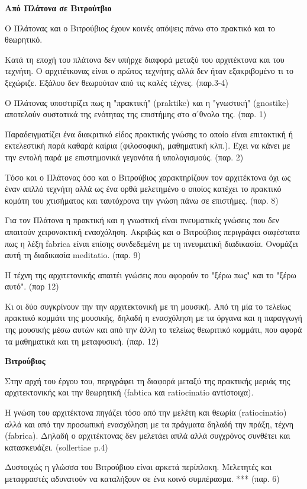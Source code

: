 \textbf{Από Πλάτονα σε Βιτρούτβιο}

Ο Πλάτονας και ο Βιτρούβιος έχουν κοινές απόψεις πάνω στο πρακτικό και το
θεωρητικό.

Κατά τη εποχή του πλάτονα δεν υπήρχε διαφορά μεταξύ του αρχιτέκτονα και του
τεχνήτη. Ο αρχιτέτκονας είναι ο πρώτος τεχνήτης αλλά δεν ήταν εξακριβομένο τι το
ξεχώριζε. Εξάλου δεν θεωρούταν από τις καλές τέχνες. (παρ.3-4)

Ο Πλάτονας υποστιρίζει πως η "πρακτική" (praktike) και η "γνωστική" (gnostike)
αποτελούν συστατικά της ενότητας της επιστήμης στο σ΄θνολο της. (παρ. 1)

Παραδειγματίζει ένα διακριτικό είδος πρακτικής γνώσης το οποίο είναι επιτακτική
ή εκτελεστική παρά καθαρά καίρια (φιλοσοφική, μαθηματική κλπ.). Έχει να κάνει με
την εντολή παρά με επιστημονικά γεγονότα ή υπολογισμούς. (παρ. 2)

Τόσο και ο Πλάτονας όσο και ο Βιτρούβιος χαρακτηρίζουν τον αρχιτέκτονα όχι ως
έναν απλλό τεχνήτη αλλά ως ένα ορθά μελετημένο ο οποίος κατέχει το πρακτικό
κομάτη του χτισήματος και ταυτόχρονα την γνώση πάνω σε επιστήμες. (παρ. 8)

Για τον Πλάτονα η πρακτική και η γνωστική είναι πνευματικές γνώσεις που δεν
απαιτούν χειρονακτική ενασχόληση. Ακριβώς και ο Βιτρούβιος περιγράφει σαφέστατα
πως η λέξη fabrica είναι επίσης συνδεδεμένη με τη πνευματική διαδικασία.
Ονομάζει αυτή τη διαδικασία meditatio. (παρ. 9)

Η τέχνη της αρχιτετονικής απαιτέι γνώσεις που αφορούν το "ξέρω πως" και το "ξέρω
αυτό". (παρ 12)

Κι οι δύο συγκρίνουν την την αρχιτεκτονική με τη μουσική. Από τη μία το τελείως
πρακτικό κομμάτι της μουσικής, δηλαδή η ενασχόληση με τα όργανα και η παραγγωγή
της μουσικής μέσω αυτών και από την άλλη το τελείως θεωριτικό κομμάτι, που αφορά
τα μαθηματικά και τη μεταφυσική. (παρ. 12)

\textbf{Βιτρούβιος}

Στην αρχή του έργου του, περιγράφει τη διαφορά μεταξύ της πρακτικής μεριάς της
αρχιτεκτονικής και την θεωρητική (fabtica και ratiocinatio αντίστοιχα).

Η γνώση του αρχιτέκτονα πηγάζει τόσο από την μελέτη και θεωρία (ratiocinatio)
αλλά και από την προσωπική ενασχόληση με τα πράγματα δηλαδή την πράξη, τέχνη
(fabrica). Δηλαδή ο αρχιτέκτονας δεν μελετάει απλά αλλά συγχρόνος συνθέτει και
κατασκευάζει. (sollertiae p.4)

Δυστοιχώς η γλώσσα του Βιτρούβιου είναι αρκετά περίπλοκη. Μελετητές και
μεταφραστές αδυνατούν να καταλήξουν σε ένα κοινό συμπέρασμα. *** (παρ. 6)

